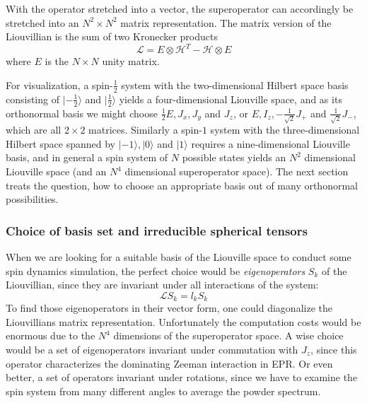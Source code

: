 \documentclass[11.5pt,a4paper]{article}
\begin{document}
With the operator stretched into a vector, the superoperator can accordingly be stretched into an $N^2 \times N^2$ matrix representation. The matrix version of the Liouvillian is the sum of two Kronecker products
\begin{equation}
 \mathcal{L} = E \otimes \mathcal{H}^T - \mathcal{H} \otimes E
\end{equation}
where $E$ is the $N \times N$ unity matrix. 

For visualization, a spin-$\tfrac{1}{2}$ system with the two-dimensional Hilbert space basis consisting of $|-\tfrac{1}{2}\rangle$ and $|\tfrac{1}{2}\rangle$ yields a four-dimensional Liouville space, and as its orthonormal basis we might choose $\tfrac{1}{2}E, J_x, J_y$ and $J_z$, or $E, I_z, -\tfrac{1}{\sqrt{2}} J_+$ and $\tfrac{1}{\sqrt{2}} J_-$, which are all $2\times 2$ matrices. Similarly a spin-$1$ system with the three-dimensional Hilbert space spanned by $|-1\rangle, |0\rangle$ and $|1\rangle$ requires a nine-dimensional Liouville basis, and in general a spin system of $N$ possible states yields an $N^2$ dimensional Liouville space (and an $N^4$ dimensional superoperator space). 
The next section treats the question, how to choose an appropriate basis out of many orthonormal possibilities.

\subsubsection{Choice of basis set and irreducible spherical tensors}
When we are looking for a suitable basis of the Liouville space to conduct some spin dynamics simulation, the perfect choice would be \emph{eigenoperators} $S_k$ of the Liouvillian, since they are invariant under all interactions of the system:
\begin{equation}
  \mathcal{L} S_k = l_k S_k
\end{equation}
To find those eigenoperators in their vector form, one could diagonalize the Liouvillians matrix representation. Unfortunately the computation costs would be enormous due to the $N^4$ dimensions of the superoperator space. A wise choice would be a set of eigenoperators invariant under commutation with $J_z$, since this operator characterizes the dominating Zeeman interaction in EPR. Or even better, a set of operators invariant under rotations, since we have to examine the spin system from many different angles to average the powder spectrum.
\end{document}
